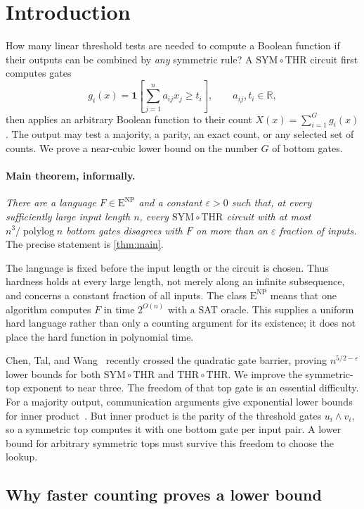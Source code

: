 \documentclass[11pt,letterpaper]{article}
\theoremstyle{definition}
\theoremstyle{remark}
\newcommand{\R}{\mathbb R}
\newcommand{\THR}{\mathrm{THR}}
\newcommand{\SYM}{\mathrm{SYM}}
\newcommand{\ENP}{\mathrm{E}^{\mathrm{NP}}}
\newcommand{\ind}{\mathbf 1}
\begin{document}
\section{Introduction}\label{sec:intro}

How many linear threshold tests are needed to compute a Boolean
function if their outputs can be combined by \emph{any} symmetric
rule? A \(\SYM\circ\THR\) circuit first computes gates
\[
 g_i(x)=\ind\!\left[\sum_{j=1}^n a_{ij}x_j\ge t_i\right],
 \qquad a_{ij},t_i\in\R,
\]
then applies an arbitrary Boolean function to their count
\(X(x)=\sum_{i=1}^G g_i(x)\). The output may test a majority, a
parity, an exact count, or any selected set of counts. We prove a
near-cubic lower bound on the number \(G\) of bottom gates.

\paragraph{Main theorem, informally.}
\emph{There are a language \(F\in\ENP\) and a constant
\(\varepsilon>0\) such that, at every sufficiently large input
length \(n\), every \(\SYM\circ\THR\) circuit with at most
\(n^3/\operatorname{polylog}n\) bottom gates disagrees with \(F\)
on more than an \(\varepsilon\) fraction of inputs.}
The precise statement is \cref{thm:main}.

The language is fixed before the input length or the circuit is
chosen. Thus hardness holds at every large length, not merely along
an infinite subsequence, and concerns a constant fraction of all
inputs. The class \(\ENP\) means that one algorithm computes \(F\)
in time \(2^{O(n)}\) with a SAT oracle. This supplies a uniform hard
language rather than only a counting argument for its existence;
it does not place the hard function in polynomial time.

Chen, Tal, and Wang~\cite{CTW26} recently crossed the quadratic gate
barrier, proving \(n^{5/2-\varepsilon}\) lower bounds for both
\(\SYM\circ\THR\) and \(\THR\circ\THR\). We improve the
symmetric-top exponent to near three. The freedom of that top gate
is an essential difficulty. For a majority output, communication
arguments give exponential lower bounds for inner
product~\cite{HMPST93,Nis94}. But inner product is the parity of the
threshold gates \(u_i\wedge v_i\), so a symmetric top computes it
with one bottom gate per input pair. A lower bound for arbitrary
symmetric tops must survive this freedom to choose the lookup.

\subsection{Why faster counting proves a lower bound}\label{sec:counting-bridge}
\end{document}
